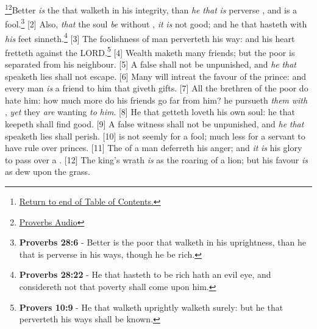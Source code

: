 \footnote{\textcolor[cmyk]{0.99998,1,0,0}{\hyperlink{TOC}{Return to end of Table of Contents.}}}\footnote{\href{https://audiobible.com/bible/proverbs_19.html}{\textcolor[cmyk]{0.99998,1,0,0}{Proverbs Audio}}}\textcolor[cmyk]{0.99998,1,0,0}{Better \emph{is} the  that walketh in his integrity, than \emph{he} \emph{that} \emph{is} perverse , and is a fool.}\footnote{\textbf{Proverbs 28:6} - Better is the poor that walketh in his uprightness, than he that is perverse in his ways, though he be rich.} 
[2] \textcolor[cmyk]{0.99998,1,0,0}{Also, \emph{that} the soul \emph{be} without , \emph{it} \emph{is} not good; and he that hasteth with \emph{his} feet sinneth.}\footnote{\textbf{Proverbs 28:22} - He that hasteth to be rich hath an evil eye, and considereth not that poverty shall come upon him.} 
[3] \textcolor[cmyk]{0.99998,1,0,0}{The foolishness of man perverteth his way: and his heart fretteth against the LORD.}\footnote{\textbf{Provers 10:9} - He that walketh uprightly walketh surely: but he that perverteth his ways shall be known.} 
[4] \textcolor[cmyk]{0.99998,1,0,0}{Wealth maketh many friends; but the poor is separated from his neighbour.}
[5] \textcolor[cmyk]{0.99998,1,0,0}{A false  shall not be unpunished, and \emph{he} \emph{that} speaketh lies shall not escape.}
[6] \textcolor[cmyk]{0.99998,1,0,0}{Many will intreat the favour of the prince: and every man \emph{is} a friend to him that giveth gifts.}
[7] \textcolor[cmyk]{0.99998,1,0,0}{All the brethren of the poor do hate him: how much more do his friends go far from him? he pursueth \emph{them} \emph{with} , \emph{yet} they \emph{are} wanting \emph{to} \emph{him}.}
[8] \textcolor[cmyk]{0.99998,1,0,0}{He that getteth  loveth his own soul: he that keepeth  shall find good.}
[9] \textcolor[cmyk]{0.99998,1,0,0}{A false witness shall not be unpunished, and \emph{he} \emph{that} speaketh lies shall perish.}
[10] \textcolor[cmyk]{0.99998,1,0,0}{ is not seemly for a fool; much less for a servant to have rule over princes.}
[11] \textcolor[cmyk]{0.99998,1,0,0}{The  of a man deferreth his anger; and \emph{it} \emph{is} his glory to pass over a .}
[12] \textcolor[cmyk]{0.99998,1,0,0}{The king's wrath \emph{is} as the roaring of a lion; but his favour \emph{is} as dew upon the grass.}
